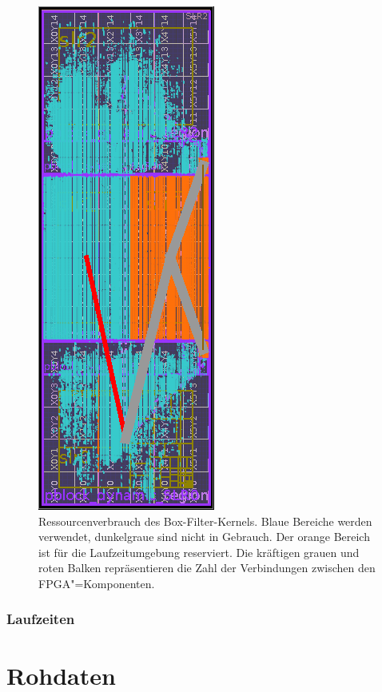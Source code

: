 \begin{figure}
    \centering
    \includegraphics{box_resources.png}
    \caption[Ressourcenverbrauch des Box-Filter-Kernels]{Ressourcenverbrauch des
             Box-Filter-Kernels. Blaue Bereiche werden verwendet, dunkelgraue
             sind nicht in Gebrauch. Der orange Bereich ist für die
             Laufzeitumgebung reserviert. Die kräftigen grauen und roten Balken
             repräsentieren die Zahl der Verbindungen zwischen den
             FPGA"=Komponenten.}
\end{figure}

\subsubsection{Laufzeiten}

\section{Rohdaten}

